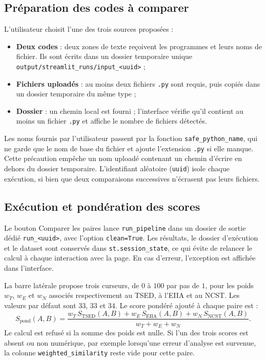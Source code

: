 {\subsection{Préparation des codes à comparer}

L'utilisateur choisit l'une des trois sources proposées :
\begin{itemize}
  \item \textbf{Deux codes} : deux zones de texte reçoivent les programmes et
        leurs noms de fichier. Ils sont écrits dans un dossier temporaire
        unique \texttt{output/streamlit\_runs/input\_<uuid>} ;
  \item \textbf{Fichiers uploadés} : au moins deux fichiers \texttt{.py} sont
        requis, puis copiés dans un dossier temporaire du même type ;
  \item \textbf{Dossier} : un chemin local est fourni ; l'interface vérifie
        qu'il contient au moins un fichier \texttt{.py} et affiche le nombre
        de fichiers détectés.
\end{itemize}

Les noms fournis par l'utilisateur passent par la fonction
\texttt{safe\_python\_name}, qui ne garde que le nom de base du fichier et
ajoute l'extension \texttt{.py} si elle manque. Cette précaution empêche un nom
uploadé contenant un chemin d'écrire en dehors du dossier temporaire.
L'identifiant aléatoire (\texttt{uuid}) isole chaque exécution, si bien que
deux comparaisons successives n'écrasent pas leurs fichiers.

\subsection{Exécution et pondération des scores}

Le bouton \og Comparer les paires \fg{} lance \texttt{run\_pipeline} dans un
dossier de sortie dédié \texttt{run\_<uuid>}, avec l'option \texttt{clean=True}.
Les résultats, le dossier d'exécution et le dataset sont conservés dans
\texttt{st.session\_state}, ce qui évite de relancer le calcul à chaque
interaction avec la page. En cas d'erreur, l'exception est affichée dans
l'interface.

La barre latérale propose trois curseurs, de $0$ à $100$ par pas de $1$, pour
les poids $w_T$, $w_E$ et $w_N$ associés respectivement au TSED, à l'EIIA et au
NCST. Les valeurs par défaut sont $33$, $33$ et $34$. Le score pondéré ajouté
à chaque paire est :
\begin{equation}
S_{\mathrm{pond}}(A,B) = \frac{w_T\, S_{\mathrm{TSED}}(A,B) + w_E\,
S_{\mathrm{EIIA}}(A,B) + w_N\, S_{\mathrm{NCST}}(A,B)}{w_T + w_E + w_N}.
\end{equation}
Le calcul est refusé si la somme des poids est nulle. Si l'un des trois scores
est absent ou non numérique, par exemple lorsqu'une erreur d'analyse est
survenue, la colonne \texttt{weighted\_similarity} reste vide pour cette paire.

}
